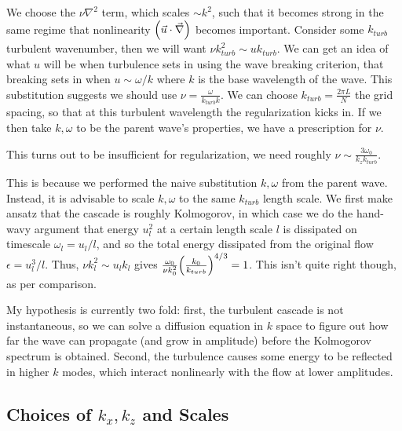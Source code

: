 \documentclass[11pt,
        usenames, %
        dvipsnames %
    ]{report}
\DeclarePairedDelimiter\p{\lparen}{\rparen}
\begin{document}
We choose the $\nu \nabla^2$ term, which scales $\sim k^2$, such that it becomes
strong in the same regime that nonlinearity $\p*{\vec{u} \cdot \vec{\nabla}}$
becomes important. Consider some $k_{turb}$ turbulent wavenumber, then we will
want $\nu k_{turb}^2 \sim uk_{turb}$. We can get an idea of what $u$ will be
when turbulence sets in using the wave breaking criterion, that breaking sets in
when $u \sim \omega/k$ where $k$ is the base wavelength of the wave. This
substitution suggests we should use $\nu = \frac{\omega}{k_{turb}k}$. We can
choose $k_{turb} = \frac{2\pi L}{N}$ the grid spacing, so that at this turbulent
wavelength the regularization kicks in. If we then take $k, \omega$ to be the
parent wave's properties, we have a prescription for $\nu$.

This turns out to be insufficient for regularization, we need roughly $\nu \sim
\frac{3\omega_0}{k_zk_{turb}}$.

This is because we performed the naive substitution $k, \omega$ from the parent
wave. Instead, it is advisable to scale $k, \omega$ to the same $k_{turb}$
length scale. We first make ansatz that the cascade is roughly Kolmogorov, in
which case we do the hand-wavy argument that energy $u_l^2$ at a certain length
scale $l$ is dissipated on timescale $\omega_l = u_l / l$, and so the total
energy dissipated from the original flow $\epsilon = u_l^3/l$. Thus, $\nu k_l^2
\sim u_lk_l$ gives $\frac{\omega_0}{\nu k_0^2}\p*{\frac{k_0}{k_{turb}}}^{4/3} =
1$. This isn't quite right though, as per comparison.

My hypothesis is currently two fold: first, the turbulent cascade is not
instantaneous, so we can solve a diffusion equation in $k$ space to figure out
how far the wave can propagate (and grow in amplitude) before the Kolmogorov
spectrum is obtained. Second, the turbulence causes some energy to be reflected
in higher $k$ modes, which interact nonlinearly with the flow at lower
amplitudes.

\subsection{Choices of $k_x, k_z$ and Scales}
\end{document}
